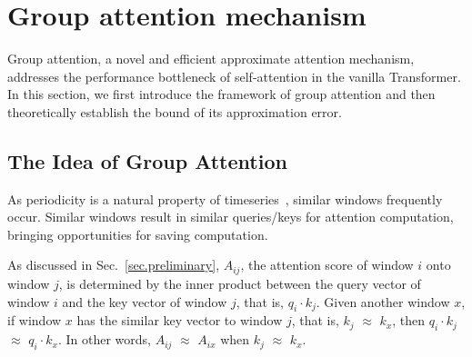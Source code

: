 \section{Group attention mechanism}
\label{sec.group}

\begin{sloppypar}
Group attention, a novel and efficient approximate attention mechanism, addresses the performance bottleneck of self-attention in the vanilla Transformer.
In this section, we first introduce the framework of group attention and then theoretically establish the bound of its approximation error.

\subsection{The Idea of Group Attention}
\label{sec.group.ideas}

As periodicity is a natural property of timeseries~\cite{10.1145/3448016.3452779}, similar windows frequently occur. Similar windows result in similar queries/keys for attention computation, bringing opportunities for saving computation.


As discussed in Sec.~\ref{sec.preliminary}, $A_{ij}$, the attention score of window $i$ onto window $j$, is determined by the inner product between the query vector of window $i$ and the key vector of window $j$, that is, $q_i \cdot k_j$. 
Given another window $x$, if window $x$ has the similar key vector to window $j$, that is, $k_j$ $\approx$ $k_x$, then $q_i \cdot k_j$ $\approx$ $q_i \cdot k_x$.
In other words, $A_{ij}$ $\approx$ $A_{ix}$ when $k_j$ $\approx$ $k_x$.



\end{sloppypar}
